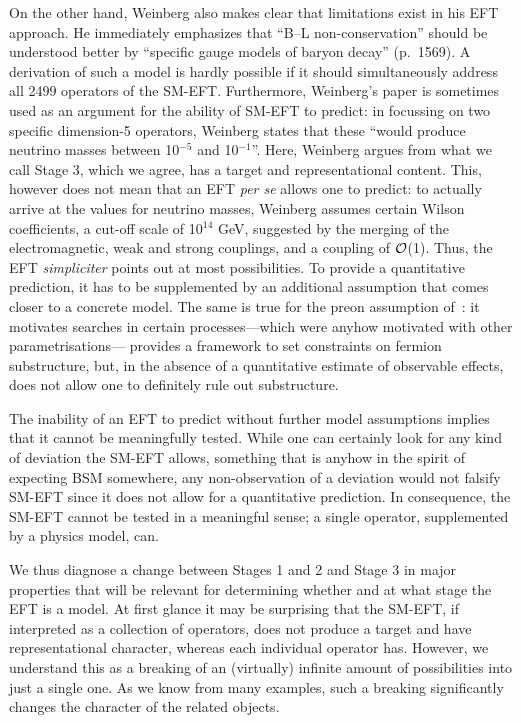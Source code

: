 On the other hand, Weinberg also makes clear that limitations exist in his EFT approach. 
He immediately emphasizes that
``B--L non-conservation'' should be understood better by ``specific gauge models of
baryon decay'' (p.~1569).
A derivation of such a model is hardly possible if it should simultaneously address all 2499 operators
of the SM-EFT.
Furthermore, Weinberg's paper is sometimes used as an argument for the ability of 
SM-EFT to predict:
in focussing on two specific dimension-5 operators, Weinberg states that these 
``would produce neutrino masses between 10$^{-5}$ and 10$^{-1}$''.
Here, Weinberg argues from what we call Stage 3, which we agree, has a target
and representational content.
This, however does not mean that an EFT \textit{per se} allows one to predict:
to actually arrive at the values for neutrino masses,
Weinberg assumes certain Wilson coefficients, a cut-off scale of 
10$^{14}$ GeV, suggested by the merging of the electromagnetic, weak and strong couplings, 
and a coupling of $\cal{O}$(1).
Thus, the EFT \textit{simpliciter} points out at most possibilities. 
To provide a quantitative prediction, it has to be supplemented by an additional assumption 
that comes closer to a concrete model.
The same is true for the preon assumption of~\cite{Eichten:1983hw}: it motivates searches
in certain processes---which were anyhow motivated with other parametrisations---
provides a framework to set constraints on fermion substructure, but, in the absence of a quantitative
estimate of observable effects, does not allow one to definitely rule out substructure. 

The inability of an EFT to predict without further model assumptions implies that it
cannot be meaningfully tested.
While one can certainly look for any kind of deviation the SM-EFT allows, something
that is anyhow in the spirit of expecting BSM somewhere,
any non-observation of a deviation would not falsify SM-EFT since it does not
allow for a quantitative prediction.  
In consequence, the SM-EFT cannot be tested in a meaningful sense; 
a single operator, supplemented by a physics model, can. 

We thus diagnose a change between Stages 1 and 2 and Stage 3 
in major properties that will be relevant for determining whether and at what stage the EFT is a model. 
At first glance it may be surprising that the SM-EFT, if interpreted as a collection of operators,
does not produce a target and have representational character,
whereas each individual operator has.
However, we understand this as a breaking of an (virtually) infinite amount of possibilities
into just a single one.
As we know from many examples, such a breaking significantly changes the character of 
the related objects. 
  
